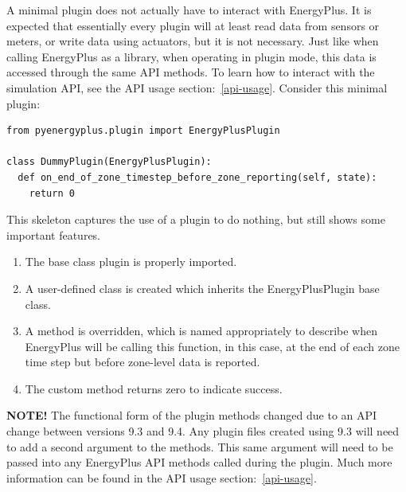 A minimal plugin does not actually have to interact with EnergyPlus.
It is expected that essentially every plugin will at least read data from sensors or meters, or write data using actuators, but it is not necessary.
Just like when calling EnergyPlus as a library, when operating in plugin mode, this data is accessed through the same API methods.
To learn how to interact with the simulation API, see the API usage section:~\ref{api-usage}.
Consider this minimal plugin:

\begin{lstlisting}
from pyenergyplus.plugin import EnergyPlusPlugin

class DummyPlugin(EnergyPlusPlugin):
  def on_end_of_zone_timestep_before_zone_reporting(self, state):
    return 0
\end{lstlisting}

This skeleton captures the use of a plugin to do nothing, but still shows some important features.
\begin{enumerate}
    \item The base class plugin is properly imported.
    \item A user-defined class is created which inherits the EnergyPlusPlugin base class.
    \item A method is overridden, which is named appropriately to describe when EnergyPlus will be calling this function, in this case, at the end of each zone time step but before zone-level data is reported.
    \item The custom method returns zero to indicate success.
\end{enumerate}

\textbf{NOTE!}  The functional form of the plugin methods changed due to an API change between versions 9.3 and 9.4.
Any plugin files created using 9.3 will need to add a second argument to the methods.
This same argument will need to be passed into any EnergyPlus API methods called during the plugin.
Much more information can be found in the API usage section:~\ref{api-usage}.

